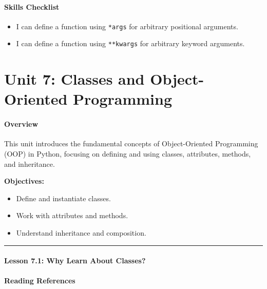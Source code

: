 \documentclass[
  justified,
  openright,
]{tufte-book}
\let\subsection\paragraph
\let\paragraph\paragraph
\let\subsection\paragraph
\let\paragraph\paragraph
\providecommand{\tightlist}{%
  \setlength{\itemsep}{0pt}\setlength{\parskip}{0pt}}
\begin{document}
\subsection{Skills Checklist}\label{skills-checklist-31}

\begin{itemize}
\tightlist
\item[$\square$]
  I can define a function using \texttt{*args} for arbitrary positional
  arguments.
\item[$\square$]
  I can define a function using \texttt{**kwargs} for arbitrary keyword
  arguments.
\end{itemize}

\newpage

\section{Unit 7: Classes and Object-Oriented
Programming}\label{unit-7-classes-and-object-oriented-programming-1}

\subsection{Overview}\label{overview-7}

This unit introduces the fundamental concepts of Object-Oriented
Programming (OOP) in Python, focusing on defining and using classes,
attributes, methods, and inheritance.

\textbf{Objectives:}

\begin{itemize}
\tightlist
\item
  Define and instantiate classes.
\item
  Work with attributes and methods.
\item
  Understand inheritance and composition.
\end{itemize}

\begin{center}\rule{0.5\linewidth}{0.5pt}\end{center}

\subsection{Lesson 7.1: Why Learn About
Classes?}\label{lesson-7.1-why-learn-about-classes}

\subsection{Reading References}\label{reading-references-19}
\end{document}

